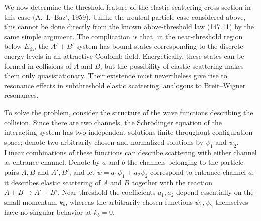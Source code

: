 We now determine the threshold feature of the elastic-scattering cross section in this case (A.~I.~Baz', 1959). Unlike the neutral-particle case considered above, this cannot be done directly from the known above-threshold law (147.11) by the same simple argument. The complication is that, in the near-threshold region below $E_{\mathrm{th}}$, the $A'+B'$ system has bound states corresponding to the discrete energy levels in an attractive Coulomb field. Energetically, these states can be formed in collisions of $A$ and $B$, but the possibility of elastic scattering makes them only quasistationary. Their existence must nevertheless give rise to resonance effects in subthreshold elastic scattering, analogous to Breit--Wigner resonances.

To solve the problem, consider the structure of the wave functions describing the collision. Since there are two channels, the Schrödinger equation of the interacting system has two independent solutions finite throughout configuration space; denote two arbitrarily chosen and normalized solutions by $\psi_1$ and $\psi_2$. Linear combinations of these functions can describe scattering with either channel as entrance channel. Denote by $a$ and $b$ the channels belonging to the particle pairs $A,B$ and $A',B'$, and let $\psi=a_1\psi_1+a_2\psi_2$ correspond to entrance channel $a$; it describes elastic scattering of $A$ and $B$ together with the reaction $A+B\to A'+B'$. Near threshold the coefficients $a_1,a_2$ depend essentially on the small momentum $k_b$, whereas the arbitrarily chosen functions $\psi_1,\psi_2$ themselves have no singular behavior at $k_b=0$.

